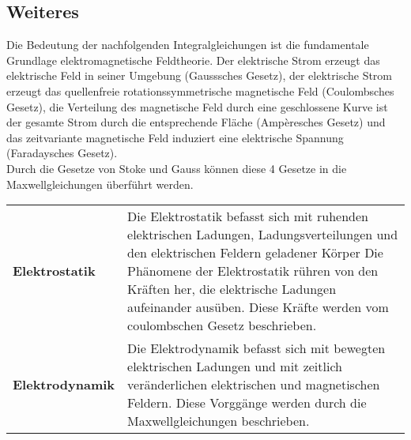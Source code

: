 \subsection{Weiteres}
Die Bedeutung der nachfolgenden Integralgleichungen ist die fundamentale Grundlage elektromagnetische Feldtheorie. Der elektrische Strom erzeugt das elektrische Feld in seiner Umgebung (Gausssches Gesetz), der elektrische Strom erzeugt das quellenfreie rotationssymmetrische magnetische Feld (Coulombsches Gesetz), die Verteilung des magnetische Feld durch eine geschlossene Kurve ist der gesamte Strom durch die entsprechende Fläche (Ampèresches Gesetz) und das zeitvariante magnetische Feld induziert eine elektrische Spannung (Faradaysches Gesetz).\\
Durch die Gesetze von Stoke und Gauss können diese 4 Gesetze in die Maxwellgleichungen überführt werden. 
\begin{longtable}{p{} p{}}
	\textbf{Elektrostatik} & Die Elektrostatik befasst sich mit ruhenden elektrischen Ladungen, Ladungsverteilungen und den elektrischen Feldern geladener Körper
	Die Phänomene der Elektrostatik rühren von den Kräften her, die elektrische Ladungen aufeinander ausüben. Diese Kräfte werden vom coulombschen Gesetz beschrieben.\\
	\textbf{Elektrodynamik} & Die Elektrodynamik befasst sich mit bewegten elektrischen Ladungen und mit zeitlich veränderlichen elektrischen und magnetischen Feldern. Diese Vorggänge werden durch die Maxwellgleichungen beschrieben. \\
\end{longtable}

\clearpage
\pagebreak